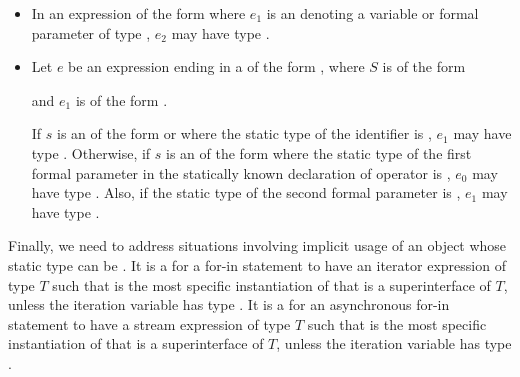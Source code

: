 \documentclass[makeidx]{article}
\begin{document}
{\begin{itemize}
  An actual parameter expression corresponding to a formal parameter
  whose statically known type annotation is \VOID{}
  may have type \VOID.
\item
  In an expression of the form 
  where $e_1$ is an 
  denoting a variable or formal parameter of type \VOID,
  $e_2$ may have type \VOID.
\item
  Let $e$ be an expression ending in a 
  of the form ,
  where $S$ is of the form

  \noindent

  \noindent
  and $e_1$ is of the form .

  If $s$ is an  of the
  form  or 
  where the static type of the identifier \id{} is \VOID,
  $e_1$ may have type \VOID.
  Otherwise, if $s$ is an  of the form
  \code{[$\,e_0\,$]} where the static type of
  the first formal parameter in the statically known declaration
  of operator \code{[]=} is \VOID,
  $e_0$ may have type \VOID.
  Also, if the static type of the second formal parameter is \VOID,
  $e_1$ may have type \VOID.
\end{itemize}

\LMHash{}%
Finally, we need to address situations involving implicit usage of
an object whose static type can be \VOID.
%
It is a  for a for-in statement to have an iterator
expression of type $T$ such that 
is the most specific instantiation of 
that is a superinterface of $T$, unless the
iteration variable has type \VOID.
%
It is a  for an asynchronous for-in statement
to have a stream expression of type $T$
such that  is the most specific
instantiation of  that is a superinterface of $T$,
unless the iteration variable has type \VOID.


}
\end{document}
